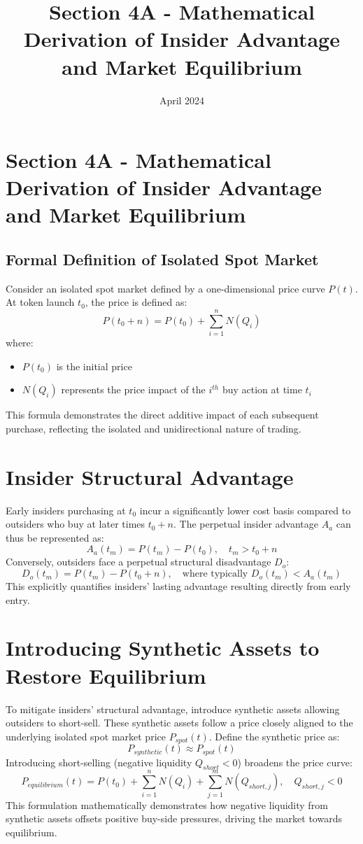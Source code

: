 \documentclass{article}
\title{Section 4A - Mathematical Derivation of Insider Advantage and Market Equilibrium}
\date{April 2024}
\begin{document}

\section{Section 4A - Mathematical Derivation of Insider Advantage and Market Equilibrium}

\subsection{Formal Definition of Isolated Spot Market}

Consider an isolated spot market defined by a one-dimensional price curve $P(t)$. At token launch $t_0$, the price is defined as:
\[
P(t_0 + n) = P(t_0) + \sum_{i=1}^{n} N(Q_i)
\]
where:
\begin{itemize}
    \item $P(t_0)$ is the initial price
    \item $N(Q_i)$ represents the price impact of the $i^{th}$ buy action at time $t_i$
\end{itemize}

This formula demonstrates the direct additive impact of each subsequent purchase, reflecting the isolated and unidirectional nature of trading.

\section{Insider Structural Advantage}

Early insiders purchasing at $t_0$ incur a significantly lower cost basis compared to outsiders who buy at later times $t_0 + n$. The perpetual insider advantage $A_a$ can thus be represented as:
\[
A_a(t_m) = P(t_m) - P(t_0), \quad t_m > t_0 + n
\]
Conversely, outsiders face a perpetual structural disadvantage $D_o$:
\[
D_o(t_m) = P(t_m) - P(t_0 + n), \quad \text{where typically } D_o(t_m) < A_a(t_m)
\]
This explicitly quantifies insiders' lasting advantage resulting directly from early entry.

\section{Introducing Synthetic Assets to Restore Equilibrium}

To mitigate insiders' structural advantage, introduce synthetic assets allowing outsiders to short-sell. These synthetic assets follow a price closely aligned to the underlying isolated spot market price $P_{spot}(t)$. Define the synthetic price as:
\[
P_{synthetic}(t) \approx P_{spot}(t)
\]
Introducing short-selling (negative liquidity $Q_{short} < 0$) broadens the price curve:
\[
P_{equilibrium}(t) = P(t_0) + \sum_{i=1}^{n} N(Q_i) + \sum_{j=1}^{m} N(Q_{short,j}), \quad Q_{short,j} < 0
\]
This formulation mathematically demonstrates how negative liquidity from synthetic assets offsets positive buy-side pressures, driving the market towards equilibrium.
\end{document}
